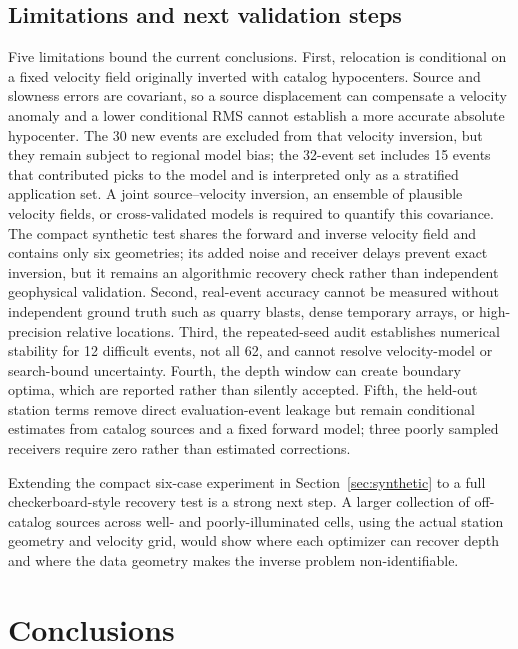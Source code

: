 \documentclass[10pt]{article}
\begin{document}
\subsection{Limitations and next validation steps}

Five limitations bound the current conclusions. First, relocation is conditional on a fixed velocity field originally inverted with catalog hypocenters. Source and slowness errors are covariant, so a source displacement can compensate a velocity anomaly and a lower conditional RMS cannot establish a more accurate absolute hypocenter. The 30 new events are excluded from that velocity inversion, but they remain subject to regional model bias; the 32-event set includes 15 events that contributed picks to the model and is interpreted only as a stratified application set. A joint source--velocity inversion, an ensemble of plausible velocity fields, or cross-validated models is required to quantify this covariance. The compact synthetic test shares the forward and inverse velocity field and contains only six geometries; its added noise and receiver delays prevent exact inversion, but it remains an algorithmic recovery check rather than independent geophysical validation. Second, real-event accuracy cannot be measured without independent ground truth such as quarry blasts, dense temporary arrays, or high-precision relative locations. Third, the repeated-seed audit establishes numerical stability for 12 difficult events, not all 62, and cannot resolve velocity-model or search-bound uncertainty. Fourth, the depth window can create boundary optima, which are reported rather than silently accepted. Fifth, the held-out station terms remove direct evaluation-event leakage but remain conditional estimates from catalog sources and a fixed forward model; three poorly sampled receivers require zero rather than estimated corrections.

Extending the compact six-case experiment in Section~\ref{sec:synthetic} to a full checkerboard-style recovery test is a strong next step. A larger collection of off-catalog sources across well- and poorly-illuminated cells, using the actual station geometry and velocity grid, would show where each optimizer can recover depth and where the data geometry makes the inverse problem non-identifiable.

\section{Conclusions}
\end{document}
